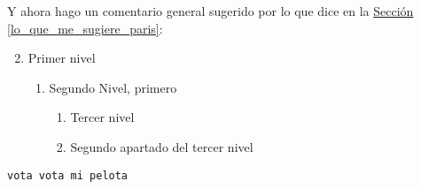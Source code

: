 \documentclass[spanish,12pt]{article}
\begin{document}
\noindent Y ahora hago un comentario general sugerido por
lo que dice en la \hyperref[lo_que_me_sugiere_paris]{Sección
  \ref*{lo_que_me_sugiere_paris}}:

\begin{enumerate}
\setcounter{enumi}{1}
\item Primer nivel
  \begin{enumerate}
  \item Segundo Nivel, primero
    \begin{enumerate}
    \item Tercer nivel
    \item Segundo apartado del tercer nivel
    \end{enumerate}
  \end{enumerate}
\end{enumerate}

\verb|vota vota mi pelota|
\end{document}
